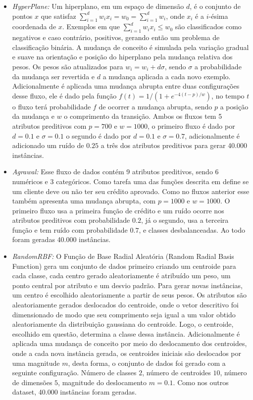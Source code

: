 \begin{itemize}
\item{\textit{HyperPlane:}} Um hiperplano, em um espaço de dimensão $d$, é o conjunto de pontos
$x$ que satisfaz $\sum^{d}_{i=1} w_i x_i = w_0 = \sum^{d}_{i=1} w_i$, onde $x_i$ é a $i$-ésima
coordenada de $x$. Exemplos em que $\sum^{d}_{i=1} w_i x_i \leq w_0$ são classificados como
negativos e caso contrário, positivos, gerando então um problema de classificação binária.
A mudança de conceito é simulada pela variação gradual e suave na orientação e posição do
hiperplano pela mudança relativa dos pesos. Os pesos são atualizados para $w_i = w_i + d\sigma$,
sendo $\sigma$ a probabilidade da mudança ser revertida e $d$ a mudança aplicada a cada novo
exemplo. Adicionalmente é aplicada uma mudança abrupta entre duas configurações desse fluxo,
ele é dado pela função $f(t) = 1/(1+e^{-4(t-p)/w})$, no tempo $t$ o fluxo terá probabilidade
$f$ de ocorrer a mudança abrupta, sendo $p$ a posição da mudança e $w$ o comprimento da
transição. Ambos os fluxos tem 5 atributos preditivos com $p=700$ e $w=1000$, o primeiro fluxo
é dado por $d=0.1$ e $\sigma=0.1$ o segundo é dado por $d=0.1$ e $\sigma=0.7$, adicionalmente é
adicionado um ruído de $0.25$ a três dos atributos preditivos para gerar 40.000 instâncias.

\item{\textit{Agrawal:}} Esse fluxo de dados contém 9 atributos preditivos, sendo 6 numéricos e
3 categóricos. Como tarefa uma das funções descrita em \cite{agrawal1993database} define se
um cliente deve ou não ter seu crédito aprovado. Como no fluxos anterior esse também apresenta
uma mudança abrupta, com $p=1000$ e $w=1000$. O primeiro fluxo usa a primeira função de crédito
e um ruído ocorre nos atributos preditivos com probabilidade $0.2$, já o segundo, usa a terceira
função e tem ruído com probabilidade $0.7$, e classes desbalanceadas. Ao todo foram geradas
40.000 instâncias.

\item{\textit{RandomRBF:}} O Função de Base Radial Aleatória (Random Radial Basis Function)
gera um conjunto de dados primeiro criando um centroide para cada classe, cada centro gerado
aleatoriamente é atribuído um peso, um ponto central por atributo e um desvio padrão. Para
gerar novas instâncias, um centro é escolhido aleatoriamente a partir de seus pesos. Os
atributos são aleatoriamente gerados deslocados do centroide, onde o vetor descritivo foi
dimensionado de modo que seu comprimento seja igual a um valor obtido aleatoriamente da
distribuição gaussiana do centroide. Logo, o centroide, escolhido em questão, determina a
classe dessa instância. Adicionalmente é aplicada uma mudança de conceito por meio do
deslocamento dos centroides, onde a cada nova instância gerada, os centroides iniciais
são deslocados por uma magnitude $m$, desta forma, o conjunto de dados foi gerado com a
seguinte configuração. Número de classes $2$, número de centroides $10$, número de dimensões
$5$, magnitude do deslocamento $m=0.1$. Como nos outros dataset, 40.000 instâncias foram
geradas.
\end{itemize}

